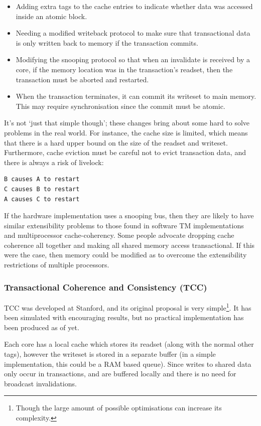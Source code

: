 \begin{itemize}
\item Adding extra tags to the cache entries to
indicate whether data was accessed inside an atomic block.
\item Needing a modified writeback protocol to make sure that transactional
data is only written back to memory if the transaction commits.
\item Modifying the snooping protocol so that when an invalidate is
received by a core, if the memory location was in the transaction's
readset, then the transaction must be aborted and restarted.
\item When the transaction terminates, it can commit its writeset to
main memory. This may require synchronisation since the commit must be
atomic.
\end{itemize}

It's not `just that simple though'; these changes bring about some
hard to solve problems in the real world. For instance, the cache size
is limited, which means that there is a hard upper bound on the size
of the readset and writeset. Furthermore, cache eviction must be
careful not to evict transaction data, and there is always a risk of
livelock:

\begin{verbatim}
B causes A to restart
C causes B to restart
A causes C to restart
\end{verbatim}

If the hardware implementation uses a snooping bus, then they are
likely to have similar extensibility problems to those found in
software TM implementations and multiprocessor cache-coherency. Some
people advocate dropping cache coherence all together and making all
shared memory access transactional. If this were the case, then memory
could be modified as to overcome the extensibility restrictions of
multiple processors.

\subsubsection{Transactional Coherence and Consistency (TCC)}

TCC was developed at Stanford, and its original proposal is very
simple\footnote{Though the large amount of possible optimisations can
increase its complexity.}. It has been simulated with encouraging
results, but no practical implementation has been produced as of yet.

Each core has a local cache which stores its readset (along with the
normal other tags), however the writeset is stored in a separate
buffer (in a simple implementation, this could be a RAM based
queue). Since writes to shared data only occur in transactions, and
are buffered locally and there is no need for broadcast invalidations.

